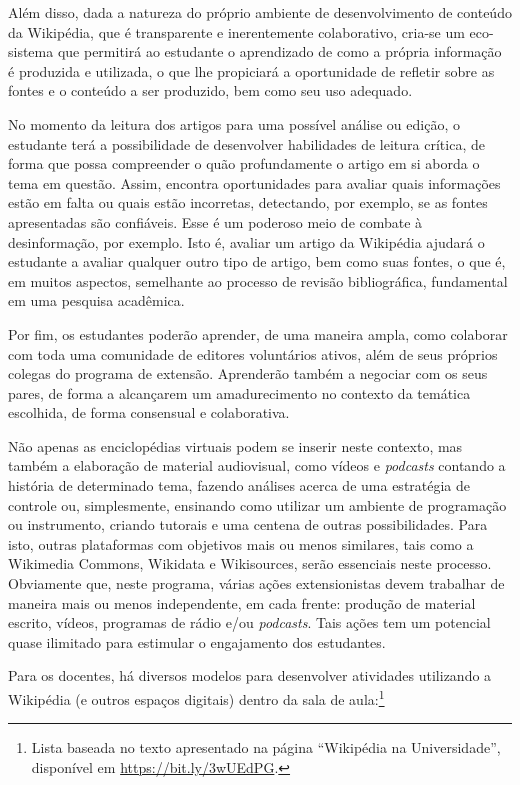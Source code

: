 \documentclass[
	12pt,				%
	openright,			%
	oneside,			%
	a4paper,			%
	english,			%
	brazil				%
	]{abntex2}
\begin{document}
Além disso, dada a natureza do próprio ambiente de desenvolvimento de conteúdo da Wikipédia, que é transparente e inerentemente colaborativo, cria-se um eco-sistema que permitirá ao estudante o aprendizado de como a própria informação é produzida e utilizada, o que lhe propiciará a oportunidade de refletir sobre as fontes e o conteúdo a ser produzido, bem como seu uso adequado.

No momento da leitura dos artigos para uma possível análise ou edição, o estudante terá a possibilidade de desenvolver habilidades de leitura crítica, de forma que possa compreender o quão profundamente o artigo em si aborda o tema em questão. Assim, encontra oportunidades para avaliar quais informações estão em falta ou quais estão incorretas, detectando, por exemplo, se as fontes apresentadas são confiáveis. Esse é um poderoso meio de combate à desinformação, por exemplo. Isto é, avaliar um artigo da Wikipédia ajudará o estudante a avaliar qualquer outro tipo de artigo, bem como suas fontes, o que é, em muitos aspectos, semelhante ao processo de revisão bibliográfica, fundamental em uma pesquisa acadêmica.

Por fim, os estudantes poderão aprender, de uma maneira ampla, como colaborar com toda uma comunidade de editores voluntários ativos, além de seus próprios colegas do programa de extensão. Aprenderão também a negociar com os seus pares, de forma a alcançarem um amadurecimento no contexto da temática escolhida, de forma consensual e colaborativa.

Não apenas as enciclopédias virtuais podem se inserir neste contexto, mas também a elaboração de material audiovisual, como vídeos e \textit{podcasts} contando a história de determinado tema, fazendo análises acerca de uma estratégia de controle ou, simplesmente, ensinando como utilizar um ambiente de programação ou instrumento, criando tutorais e uma centena de outras possibilidades. Para isto, outras plataformas com objetivos mais ou menos similares, tais como a Wikimedia Commons, Wikidata e Wikisources, serão essenciais neste processo. Obviamente que, neste programa, várias ações extensionistas devem trabalhar de maneira mais ou menos independente, em cada frente: produção de material escrito, vídeos, programas de rádio e/ou \textit{podcasts}. Tais ações tem um potencial quase ilimitado para estimular o engajamento dos estudantes.

Para os docentes, há diversos modelos para desenvolver atividades utilizando a Wikipédia (e outros espaços digitais) dentro da sala de aula:\footnote{Lista baseada no texto apresentado na página ``Wikipédia na Universidade'', disponível em \url{https://bit.ly/3wUEdPG}.}
\end{document}
